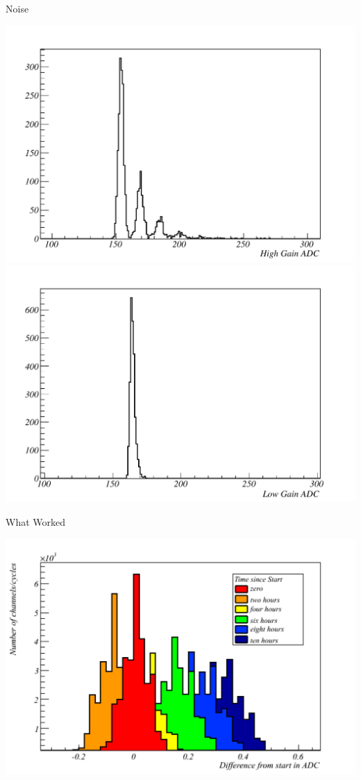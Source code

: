 \documentclass{beamer}
\begin{document}
\begin{frame}{Noise}

\begin{center}
\includegraphics[scale=0.3]{pics/wk2/highped.pdf}
\includegraphics[scale=0.3]{pics/wk2/lowped.pdf}
\end{center}

\end{frame}


\begin{frame}{What Worked}
\begin{center}
\includegraphics[scale=0.5]{pics/wk2/pedRainbow_2h.pdf}
\end{center}
\end{frame}
\end{document}

